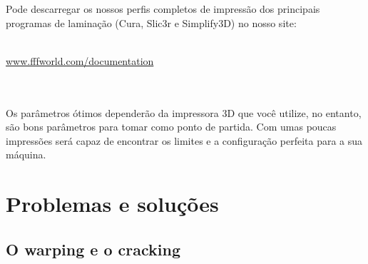 \documentclass[11pt,a4paper]{article}
\begin{document}
Pode descarregar os nossos perfis completos de impressão dos principais programas de laminação (Cura, Slic3r e Simplify3D) no nosso site:
\\\\
\centerline{ {\huge \url{www.fffworld.com/documentation} } }
\\\\
Os parâmetros ótimos dependerão da impressora 3D que você utilize, no entanto, são bons parâmetros para tomar como ponto de partida. Com umas poucas impressões será capaz de encontrar os limites e a configuração perfeita para a sua máquina.
\section{Problemas e soluções}
	\subsection{O warping e o cracking}
\end{document}
